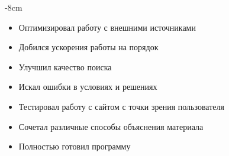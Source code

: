 \documentclass[10pt,a4paper]{altacv}
\begin{document}

\begin{adjustwidth}{}{-8cm}
\makecvheader
\end{adjustwidth}


\begin{itemize}
\item Оптимизировал работу с внешними источниками
\item Добился ускорения работы на порядок
\item Улучшил качество поиска
\end{itemize}
   
\divider

\begin{itemize}
\item Искал ошибки в условиях и решениях
\item Тестировал работу с сайтом с точки зрения пользователя
\end{itemize}
\divider

\begin{itemize}
\item Сочетал различные способы объяснения материала
\item Полностью готовил программу
\end{itemize}
\end{document}

